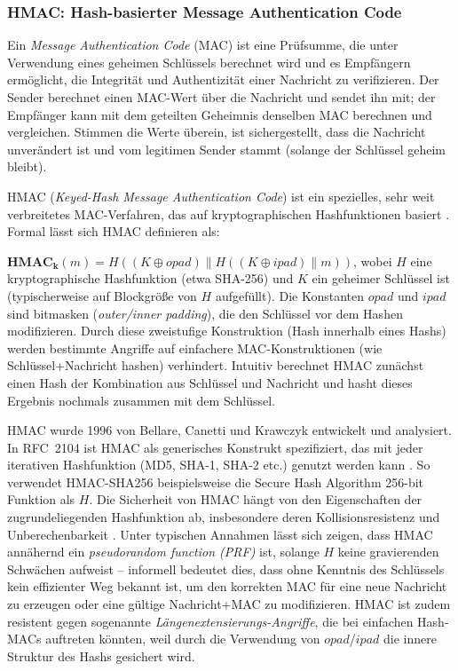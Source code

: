 \subsubsection{HMAC: Hash-basierter Message Authentication Code}

Ein \textit{Message Authentication Code} (MAC) ist eine Prüfsumme, die unter Verwendung eines geheimen Schlüssels berechnet wird und es Empfängern ermöglicht, die Integrität und Authentizität einer Nachricht zu verifizieren. Der Sender berechnet einen MAC-Wert über die Nachricht und sendet ihn mit; der Empfänger kann mit dem geteilten Geheimnis denselben MAC berechnen und vergleichen. Stimmen die Werte überein, ist sichergestellt, dass die Nachricht unverändert ist und vom legitimen Sender stammt (solange der Schlüssel geheim bleibt).

HMAC (\textit{Keyed-Hash Message Authentication Code}) ist ein spezielles, sehr weit verbreitetes MAC-Verfahren, das auf kryptographischen Hashfunktionen basiert \cite{RFC2104}. Formal lässt sich HMAC definieren als: 

$\mathbf{HMAC_{k}}(m)=H((K⊕opad)∥H((K⊕ipad)∥m))$, wobei $H$ eine kryptographische Hashfunktion (etwa SHA-256) und $K$ ein geheimer Schlüssel ist (typischerweise auf Blockgröße von $H$ aufgefüllt). Die Konstanten $opad$ und $ipad$ sind bitmasken (\textit{outer/inner padding}), die den Schlüssel vor dem Hashen modifizieren. Durch diese zweistufige Konstruktion (Hash innerhalb eines Hashs) werden bestimmte Angriffe auf einfachere MAC-Konstruktionen (wie \glqq Schlüssel+Nachricht hashen\grqq) verhindert. Intuitiv berechnet HMAC zunächst einen Hash der Kombination aus Schlüssel und Nachricht und hasht dieses Ergebnis nochmals zusammen mit dem Schlüssel.

HMAC wurde 1996 von Bellare, Canetti und Krawczyk entwickelt und analysiert. In RFC 2104 ist HMAC als generisches Konstrukt spezifiziert, das mit jeder iterativen Hashfunktion (MD5, SHA-1, SHA-2 etc.) genutzt werden kann \cite{RFC2104}. So verwendet HMAC-SHA256 beispielsweise die Secure Hash Algorithm 256-bit Funktion als $H$. Die Sicherheit von HMAC hängt von den Eigenschaften der zugrundeliegenden Hashfunktion ab, insbesondere deren Kollisionsresistenz und Unberechenbarkeit \cite{RFC2104}. Unter typischen Annahmen lässt sich zeigen, dass HMAC annähernd ein \textit{pseudorandom function (PRF)} ist, solange $H$ keine gravierenden Schwächen aufweist – informell bedeutet dies, dass ohne Kenntnis des Schlüssels kein effizienter Weg bekannt ist, um den korrekten MAC für eine neue Nachricht zu erzeugen oder eine gültige Nachricht+MAC zu modifizieren. HMAC ist zudem resistent gegen sogenannte \textit{Längenextensierungs-Angriffe}, die bei einfachen Hash-MACs auftreten könnten, weil durch die Verwendung von $opad$/$ipad$ die innere Struktur des Hashs gesichert wird.

